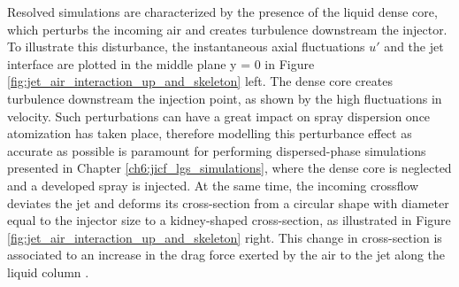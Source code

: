 Resolved simulations are characterized by the presence of the liquid dense core, which perturbs the incoming air and creates turbulence downstream the injector. To illustrate this disturbance, the instantaneous axial fluctuations $u'$ and the jet interface are plotted in the middle plane y = 0 in Figure \ref{fig:jet_air_interaction_up_and_skeleton} left. The dense core creates turbulence downstream the injection point, as shown by the high fluctuations in velocity. Such perturbations can have a great impact on spray dispersion once atomization has taken place, therefore modelling this perturbance effect as accurate as possible is paramount for performing dispersed-phase simulations presented in Chapter \ref{ch6:jicf_lgs_simulations}, where the dense core is neglected and a developed spray is injected. At the same time, the incoming crossflow deviates the jet and deforms its cross-section from a circular shape with diameter equal to the injector size to a kidney-shaped cross-section, as illustrated in Figure \ref{fig:jet_air_interaction_up_and_skeleton} right. This change in cross-section is associated to an increase in the drag force exerted by the air to the jet along the liquid column .

%



